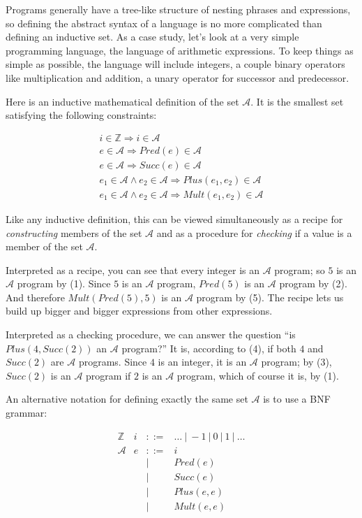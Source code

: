 \documentclass[11pt]{article}
\newcommand\mint{i}
\newcommand\Plus{\mathit{Plus}}
\newcommand\Mult{\mathit{Mult}}
\newcommand\Succ{\mathit{Succ}}
\newcommand\Pred{\mathit{Pred}}
\newcommand\Arith{\mathcal{A}}
\begin{document}
Programs generally have a tree-like structure of nesting phrases and
expressions, so defining the abstract syntax of a language is no more
complicated than defining an inductive set.
%
As a case study, let's look at a very simple programming language, the
language of arithmetic expressions.  To keep things as simple as
possible, the language will include integers, a couple binary
operators like multiplication and addition, a unary operator for
successor and predecessor.

Here is an inductive mathematical definition of the set
$\Arith$.  It is the smallest set satisfying the following
constraints:

\begin{align}
i \in \mathbb{Z} \Rightarrow i \in \Arith\\
e \in \Arith \Rightarrow \Pred(e) \in \Arith\\
e \in \Arith \Rightarrow \Succ(e) \in \Arith\\
e_1 \in \Arith \wedge e_2 \in \Arith \Rightarrow \Plus(e_1,e_2) \in \Arith\\
e_1 \in \Arith \wedge e_2 \in \Arith \Rightarrow \Mult(e_1,e_2) \in \Arith
\end{align}


Like any inductive definition, this can be viewed simultaneously as a
recipe for \emph{constructing} members of the set $\Arith$ and as a
procedure for \emph{checking} if a value is a member of the set $\Arith$.

Interpreted as a recipe, you can see that every integer is an
$\Arith$ program; so $5$ is an $\Arith$ program by
(1).  Since $5$ is an $\Arith$ program, $\Pred(5)$ is
an $\Arith$ program by (2).  And therefore
$\Mult(\Pred(5),5)$ is an $\Arith$ program by
(5).  The recipe lets us build up bigger and bigger expressions from
other expressions.  

Interpreted as a checking procedure, we can answer the question ``is
$\Plus(4,\Succ(2))$ an $\Arith$ program?''  It
is, according to (4), if both $4$ and $\Succ(2)$ are
$\Arith$ programs.  Since $4$ is an integer, it is an
$\Arith$ program; by (3), $\Succ(2)$ is an
$\Arith$ program if $2$ is an $\Arith$ program, which
of course it is, by (1).

An alternative notation for defining exactly the same set
$\Arith$ is to use a BNF grammar:

\[
\begin{array}{lrcll}
\mathbb{Z} 
               & \mint & ::= & \dots\ |\ -1\ |\ 0\ |\ 1\ |\ \dots\\
 \Arith 
               & e & ::= & i \\ %
               &   & |   & \Pred(e)\\
               &   & |   & \Succ(e)\\
               &   & |   & \Plus(e,e)\\
               &   & |   & \Mult(e,e)
\end{array}
\]
\end{document}

